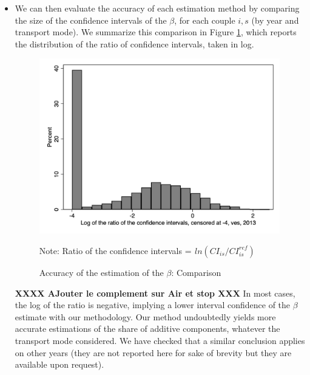 \documentclass[a4paper,11pt]{article}
\begin{document}
\begin{itemize}
\begin{itemize}
    \item We can then evaluate the accuracy of each estimation method by comparing the size of the confidence intervals of the $\beta$, for each couple $i,s$ (by year and transport mode). We summarize this comparison in Figure \ref{fig:accuracy_beta}, which reports the distribution of the ratio of confidence intervals, taken in log.


    \begin{figure}[htbp]
    \caption{Accuracy of the estimation of the $\beta$: Comparison}
    \label{fig:accuracy_beta}
    \begin{center}
    \includegraphics[height=3in]{../../revised_article/comparaison_amplitude_baseline_referee1_2013_ves.png}
    \begin{minipage} [c]  {5in} \scriptsize%
    	    Note: Ratio of the confidence intervals = $ _{}ln(CI_{is}/CI^{ref}_{is})$
    \end{minipage}

    \end{center}
    \end{figure}

   \textbf{XXXX AJouter le complement sur Air et stop XXX} In most cases, the log of the ratio is negative, implying a lower interval confidence of the $\beta$ estimate with our methodology. Our method undoubtedly yields more accurate estimations of the share of additive components, whatever the transport mode considered. We have checked that a similar conclusion applies on other years (they are not reported here for sake of brevity but they are available upon request).
    \end{itemize}


\end{itemize}
\end{document}
